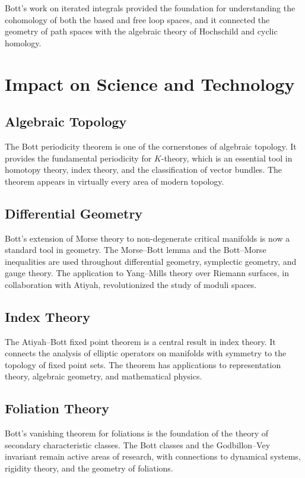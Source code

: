 Bott's work on iterated integrals provided the foundation for understanding the cohomology of both the based and free loop spaces, and it connected the geometry of path spaces with the algebraic theory of Hochschild and cyclic homology.

\section{Impact on Science and Technology}

\subsection{Algebraic Topology}

The Bott periodicity theorem is one of the cornerstones of algebraic topology. It provides the fundamental periodicity for \(K\)-theory, which is an essential tool in homotopy theory, index theory, and the classification of vector bundles. The theorem appears in virtually every area of modern topology.

\subsection{Differential Geometry}

Bott's extension of Morse theory to non-degenerate critical manifolds is now a standard tool in geometry. The Morse--Bott lemma and the Bott--Morse inequalities are used throughout differential geometry, symplectic geometry, and gauge theory. The application to Yang--Mills theory over Riemann surfaces, in collaboration with Atiyah, revolutionized the study of moduli spaces.

\subsection{Index Theory}

The Atiyah--Bott fixed point theorem is a central result in index theory. It connects the analysis of elliptic operators on manifolds with symmetry to the topology of fixed point sets. The theorem has applications to representation theory, algebraic geometry, and mathematical physics.

\subsection{Foliation Theory}

Bott's vanishing theorem for foliations is the foundation of the theory of secondary characteristic classes. The Bott classes and the Godbillon--Vey invariant remain active areas of research, with connections to dynamical systems, rigidity theory, and the geometry of foliations.

